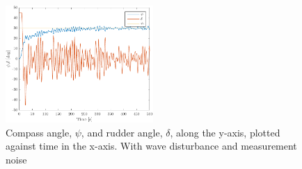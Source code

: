 \begin{figure}[ht]
    \centering
    \includegraphics[width=0.5\textwidth]{images/3d-psi_and_rudder_w_waves}
    \caption{Compass angle, $\psi$, and rudder angle, $\delta$, along the y-axis, plotted against time in the x-axis. With wave disturbance and measurement noise}
    \label{fig:3b-psi_and_rudder_w_waves}
\end{figure}